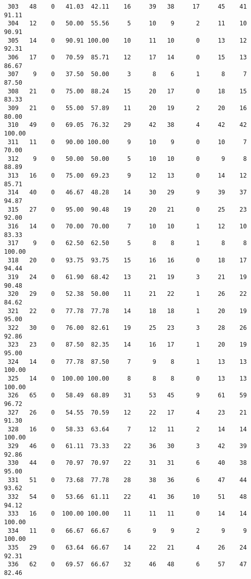 \begin{verbatim}
 303   48    0   41.03  42.11    16     39   38     17     45    41    91.11
 304   12    0   50.00  55.56     5     10    9      2     11    10    90.91
 305   14    0   90.91 100.00    10     11   10      0     13    12    92.31
 306   17    0   70.59  85.71    12     17   14      0     15    13    86.67
 307    9    0   37.50  50.00     3      8    6      1      8     7    87.50
 308   21    0   75.00  88.24    15     20   17      0     18    15    83.33
 309   21    0   55.00  57.89    11     20   19      2     20    16    80.00
 310   49    0   69.05  76.32    29     42   38      4     42    42   100.00
 311   11    0   90.00 100.00     9     10    9      0     10     7    70.00
 312    9    0   50.00  50.00     5     10   10      0      9     8    88.89
 313   16    0   75.00  69.23     9     12   13      0     14    12    85.71
 314   40    0   46.67  48.28    14     30   29      9     39    37    94.87
 315   27    0   95.00  90.48    19     20   21      0     25    23    92.00
 316   14    0   70.00  70.00     7     10   10      1     12    10    83.33
 317    9    0   62.50  62.50     5      8    8      1      8     8   100.00
 318   20    0   93.75  93.75    15     16   16      0     18    17    94.44
 319   24    0   61.90  68.42    13     21   19      3     21    19    90.48
 320   29    0   52.38  50.00    11     21   22      1     26    22    84.62
 321   22    0   77.78  77.78    14     18   18      1     20    19    95.00
 322   30    0   76.00  82.61    19     25   23      3     28    26    92.86
 323   23    0   87.50  82.35    14     16   17      1     20    19    95.00
 324   14    0   77.78  87.50     7      9    8      1     13    13   100.00
 325   14    0  100.00 100.00     8      8    8      0     13    13   100.00
 326   65    0   58.49  68.89    31     53   45      9     61    59    96.72
 327   26    0   54.55  70.59    12     22   17      4     23    21    91.30
 328   16    0   58.33  63.64     7     12   11      2     14    14   100.00
 329   46    0   61.11  73.33    22     36   30      3     42    39    92.86
 330   44    0   70.97  70.97    22     31   31      6     40    38    95.00
 331   51    0   73.68  77.78    28     38   36      6     47    44    93.62
 332   54    0   53.66  61.11    22     41   36     10     51    48    94.12
 333   16    0  100.00 100.00    11     11   11      0     14    14   100.00
 334   11    0   66.67  66.67     6      9    9      2      9     9   100.00
 335   29    0   63.64  66.67    14     22   21      4     26    24    92.31
 336   62    0   69.57  66.67    32     46   48      6     57    47    82.46

\end{verbatim}

